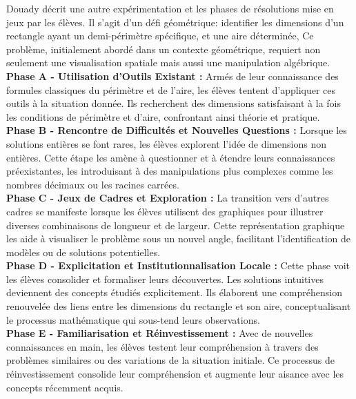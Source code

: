 Douady décrit une autre expérimentation et les phases de résolutions mise en jeux par les élèves.
Il s'agit d'un défi géométrique:
identifier les dimensions d'un rectangle ayant un demi-périmètre spécifique,
et une aire déterminée,
Ce problème,
initialement abordé dans un contexte géométrique,
requiert non seulement une visualisation spatiale mais aussi une manipulation algébrique.\\

\textbf{Phase A - Utilisation d'Outils Existant :}
Armés de leur connaissance des formules classiques du périmètre et de l'aire,
les élèves tentent d'appliquer ces outils à la situation donnée.
Ils recherchent des dimensions satisfaisant à la fois les conditions de périmètre et d'aire,
confrontant ainsi théorie et pratique.\\

\textbf{Phase B - Rencontre de Difficultés et Nouvelles Questions :}
Lorsque les solutions entières se font rares,
les élèves explorent l'idée de dimensions non entières.
Cette étape les amène à questionner et à étendre leurs connaissances préexistantes,
les introduisant à des manipulations plus complexes comme les nombres décimaux ou les racines carrées.\\

\textbf{Phase C - Jeux de Cadres et Exploration :}
La transition vers d'autres cadres se manifeste lorsque les élèves utilisent des graphiques pour illustrer diverses combinaisons de longueur et de largeur.
Cette représentation graphique les aide à visualiser le problème sous un nouvel angle,
facilitant l'identification de modèles ou de solutions potentielles.\\

\textbf{Phase D - Explicitation et Institutionnalisation Locale :}
Cette phase voit les élèves consolider et formaliser leurs découvertes.
Les solutions intuitives deviennent des concepts étudiés explicitement.
Ils élaborent une compréhension renouvelée des liens entre les dimensions du rectangle et son aire,
conceptualisant le processus mathématique qui sous-tend leurs observations.\\

\textbf{Phase E - Familiarisation et Réinvestissement :}
Avec de nouvelles connaissances en main,
les élèves testent leur compréhension à travers des problèmes similaires ou des variations de la situation initiale.
Ce processus de réinvestissement consolide leur compréhension et augmente leur aisance avec les concepts récemment acquis.\\

